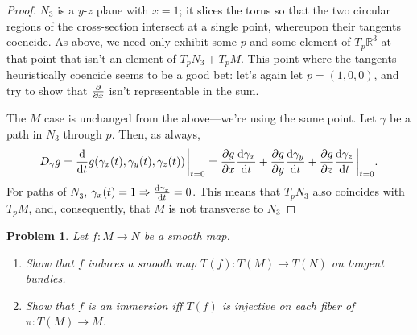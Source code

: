\documentclass{article}
\newtheorem{plm}{Problem}
\begin{document}
\begin{proof}
  $N_{3}$ is a $y$-$z$ plane with $x = 1$; it slices the torus so that the two circular regions of the cross-section
  intersect at a single point, whereupon their tangents coencide.
  As above, we need only exhibit some $p$ and some element of $T_{p}\mathbb{R}^{3}$ at that point that isn't an element
  of $T_{p}N_{3} + T_{p}M$.
  This point where the tangents heuristically coencide seems to be a good bet:
  let's again let $p = (1, 0, 0)$, and try to show that $\pdv{x}$ isn't representable in the sum.

  The $M$ case is unchanged from the above---we're using the same point.
  Let $\gamma$ be a path in $N_{3}$ through $p$.
  Then, as always,
  \[
    D_{\gamma}g = \dv{t}g(\gamma_{x}(t), \gamma_{y}(t), \gamma_{z}(t))\eval_{t = 0}
    = \pdv{g}{x}\dv{\gamma_{x}}{t} + \pdv{g}{y}\dv{\gamma_{y}}{t} + \pdv{g}{z}\dv{\gamma_{z}}{t} \eval_{t = 0}.
  \]
  For paths of $N_{3}$, $\gamma_{x}(t) = 1 \Rightarrow \dv{\gamma_{x}}{t} = 0$.
  This means that $T_{p}N_{3}$ also coincides with $T_{p}M$, and, consequently, that $M$ is not transverse to $N_{3}$
\end{proof}

\begin{plm}
  Let $f: M \to N$ be a smooth map.
  \begin{enumerate}
  \item Show that $f$ induces a smooth map $T(f): T(M) \to T(N)$ on tangent bundles.
  \item Show that $f$ is an immersion iff $T(f)$ is injective on each fiber of $\pi: T(M) \to M$.
  \end{enumerate}
\end{plm}
\end{document}
